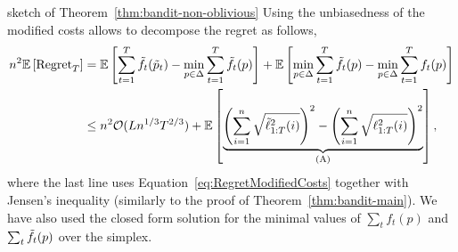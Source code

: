 \begin{proofarg}{sketch of Theorem~\ref{thm:bandit-non-oblivious}}
Using the unbiasedness of the modified costs allows to decompose the regret as follows,
\begin{align} \label{eq:MasterNonOblivious} 
n^2\expval{ \regret_T } 
&=  
\expval{   \sumtt \tf_t(\tp_t)  - \min_{p \in \Delta }  \sumtt \tf_t(p)}
+\expval{  \min_{p \in \Delta }  \sumtt \tf_t(p)  - \min_{p \in \Delta }  \sumtt f_t(p)}  \nonumber\\
&\leq
n^2\mathcal{O}(Ln^{1/3}T^{2/3}) 
+ 
\expval{  
\underset{\rA}{ \underbrace{
 \left(\sumin \sqrt{\tell_{1:T}^2(i)}  \right)^2 -  \left(\sumin \sqrt{\ell_{1:T}^2(i)}  \right)^2
 }}
 },
\end{align}
where  the last line uses  Equation~\eqref{eq:RegretModifiedCosts}  together with  Jensen's inequality (similarly to the proof of Theorem~\ref{thm:bandit-main}). We have also used the closed form solution for the minimal values of  $\sum_t f_t(p)$ and $\sum_t \tilde{f}_t(p)$ over the simplex. 


\end{proofarg}
